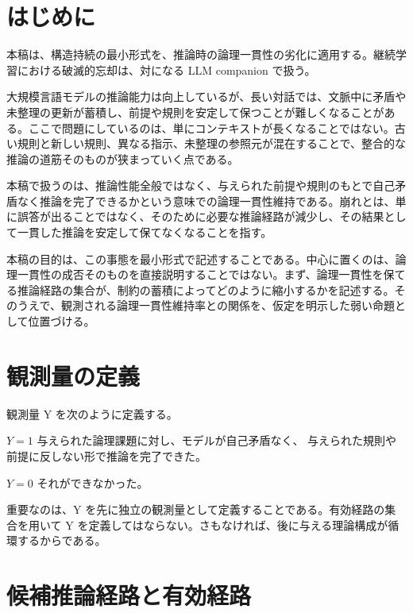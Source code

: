 \documentclass[12pt,a4paper]{article}
\begin{document}
\section{はじめに}\label{ux306fux3058ux3081ux306b}

本稿は、構造持続の最小形式を、推論時の論理一貫性の劣化に適用する。継続学習における破滅的忘却は、対になる LLM companion で扱う。

大規模言語モデルの推論能力は向上しているが、長い対話では、文脈中に矛盾や未整理の更新が蓄積し、前提や規則を安定して保つことが難しくなることがある。ここで問題にしているのは、単にコンテキストが長くなることではない。古い規則と新しい規則、異なる指示、未整理の参照元が混在することで、整合的な推論の道筋そのものが狭まっていく点である。

本稿で扱うのは、推論性能全般ではなく、与えられた前提や規則のもとで自己矛盾なく推論を完了できるかという意味での論理一貫性維持である。崩れとは、単に誤答が出ることではなく、そのために必要な推論経路が減少し、その結果として一貫した推論を安定して保てなくなることを指す。

本稿の目的は、この事態を最小形式で記述することである。中心に置くのは、論理一貫性の成否そのものを直接説明することではない。まず、論理一貫性を保てる推論経路の集合が、制約の蓄積によってどのように縮小するかを記述する。そのうえで、観測される論理一貫性維持率との関係を、仮定を明示した弱い命題として位置づける。

\section{観測量の定義}\label{ux89b3ux6e2cux91cfux306eux5b9aux7fa9}

観測量 Y を次のように定義する。

\begin{definition}[観測量 Y]
$Y = 1$
与えられた論理課題に対し、モデルが自己矛盾なく、
与えられた規則や前提に反しない形で推論を完了できた。

$Y = 0$
それができなかった。

\end{definition}

重要なのは、Y を先に独立の観測量として定義することである。有効経路の集合を用いて Y を定義してはならない。さもなければ、後に与える理論構成が循環するからである。

\section{候補推論経路と有効経路}\label{ux5019ux88dcux63a8ux8ad6ux7d4cux8defux3068ux6709ux52b9ux7d4cux8def}
\end{document}
